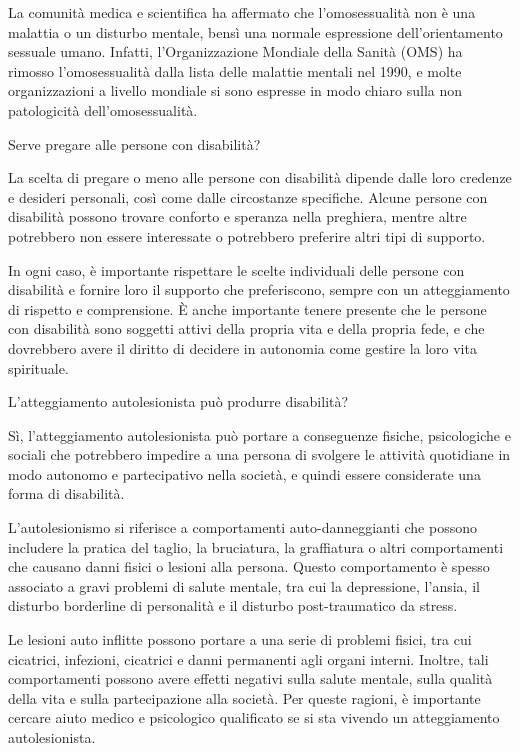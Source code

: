 \documentclass[xcolor=svgnames]{beamer}
\begin{document}
\begin{frame}
\begin{description}
La comunità medica e scientifica ha affermato che l'omosessualità non è una malattia o un disturbo mentale, bensì una normale espressione dell'orientamento sessuale umano. Infatti, l'Organizzazione Mondiale della Sanità (OMS) ha rimosso l'omosessualità dalla lista delle malattie mentali nel 1990, e molte organizzazioni a livello mondiale si sono espresse in modo chiaro sulla non patologicità dell'omosessualità.

\newpage

\item[Giovanni]
Serve pregare alle persone con disabilità?

\item[chat-GPT] La scelta di pregare o meno alle persone con disabilità dipende dalle loro credenze e desideri personali, così come dalle circostanze specifiche. Alcune persone con disabilità possono trovare conforto e speranza nella preghiera, mentre altre potrebbero non essere interessate o potrebbero preferire altri tipi di supporto.

In ogni caso, è importante rispettare le scelte individuali delle persone con disabilità e fornire loro il supporto che preferiscono, sempre con un atteggiamento di rispetto e comprensione. È anche importante tenere presente che le persone con disabilità sono soggetti attivi della propria vita e della propria fede, e che dovrebbero avere il diritto di decidere in autonomia come gestire la loro vita spirituale.

\newpage

\item[Giovanni]
L'atteggiamento autolesionista può produrre disabilità? 

\item[chat-GPT] Sì, l'atteggiamento autolesionista può portare a conseguenze fisiche, psicologiche e sociali che potrebbero impedire a una persona di svolgere le attività quotidiane in modo autonomo e partecipativo nella società, e quindi essere considerate una forma di disabilità.

L'autolesionismo si riferisce a comportamenti auto-danneggianti che possono includere la pratica del taglio, la bruciatura, la graffiatura o altri comportamenti che causano danni fisici o lesioni alla persona. Questo comportamento è spesso associato a gravi problemi di salute mentale, tra cui la depressione, l'ansia, il disturbo borderline di personalità e il disturbo post-traumatico da stress.

\tiny Le lesioni auto inflitte possono portare a una serie di problemi fisici, tra cui cicatrici, infezioni, cicatrici e danni permanenti agli organi interni. Inoltre, tali comportamenti possono avere effetti negativi sulla salute mentale, sulla qualità della vita e sulla partecipazione alla società. Per queste ragioni, è importante cercare aiuto medico e psicologico qualificato se si sta vivendo un atteggiamento autolesionista.
\end{description}


\end{frame}
\end{document}
